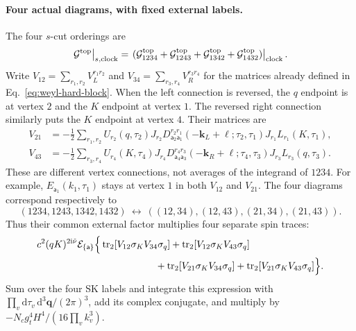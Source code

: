 \documentclass[a4paper,12pt]{article}
\newcommand{\ii}{\mathrm i}
\newcommand{\mb}{\mathbf}
\newcommand{\tn}{\tilde\nu}
\def\aa{\mathsf a}
\newcommand{\di}{\mathrm d}
\newcommand{\tr}{\operatorname{tr}}
\newcommand{\bq}{\mb q}
\newcommand{\G}{\mathcal G}
\begin{document}
\paragraph{Four actual diagrams, with fixed external labels.}
The four $s$-cut orderings are
\begin{equation}
 \left.\G^{\rm top}\right|_{s,\rm clock}
 =\left.(\G^{\rm top}_{1234}+\G^{\rm top}_{1243}
          +\G^{\rm top}_{1342}+\G^{\rm top}_{1432})\right|_{\rm clock}.
 \label{eq:external-cycle-sum}
\end{equation}
Write $V_{12}=\sum_{r_1,r_2}V_L^{r_1r_2}$ and
$V_{34}=\sum_{r_3,r_4}V_R^{r_3r_4}$ for the matrices already defined
in Eq.~\eqref{eq:weyl-hard-block}.
When the left connection is reversed, the $q$ endpoint is at vertex
$2$ and the $K$ endpoint at vertex $1$. The reversed right connection
similarly puts the $K$ endpoint at vertex $4$. Their matrices are
\begin{align}
 V_{21}
 &=-\frac12\sum_{r_1,r_2}
 U_{r_2}(q,\tau_2)J_{r_2}
 D^{r_2r_1}_{\aa_2\aa_1}(-\mb k_L+\bm\ell;\tau_2,\tau_1)
 J_{r_1}L_{r_1}(K,\tau_1),\nonumber\\
 V_{43}
 &=-\frac12\sum_{r_3,r_4}
 U_{r_4}(K,\tau_4)J_{r_4}
 D^{r_4r_3}_{\aa_4\aa_3}(-\mb k_R+\bm\ell;\tau_4,\tau_3)
 J_{r_3}L_{r_3}(q,\tau_3).
 \label{eq:reversed-physical-blocks}
\end{align}
These are different vertex connections, not averages of the integrand
of $1234$. For example, $E_{\aa_1}(k_1,\tau_1)$ stays at vertex $1$
in both $V_{12}$ and $V_{21}$.
The four diagrams correspond respectively to
\begin{equation}
 (1234,1243,1342,1432)
 \ \longleftrightarrow\
 ((12,34),(12,43),(21,34),(21,43)).
 \label{eq:four-trace-map}
\end{equation}
Thus their common external factor multiplies four separate spin traces:
\begin{align}
 &c^2(qK)^{2\ii\tn}\mathcal E_{\{\aa\}}
 \Big\{
 \tr_2[V_{12}\sigma_KV_{34}\sigma_q]
 +\tr_2[V_{12}\sigma_KV_{43}\sigma_q]\nonumber\\
 &\hspace{43mm}
 +\tr_2[V_{21}\sigma_KV_{34}\sigma_q]
 +\tr_2[V_{21}\sigma_KV_{43}\sigma_q]\Big\}.
 \label{eq:four-unintegrated-traces}
\end{align}
Sum over the four SK labels and integrate this expression with
$\prod_v\di\tau_v\,\di^3\bq/(2\pi)^3$, add its complex conjugate,
and multiply by $-N_cg_t^4H^4/(16\prod_v k_v^3)$.
\end{document}
